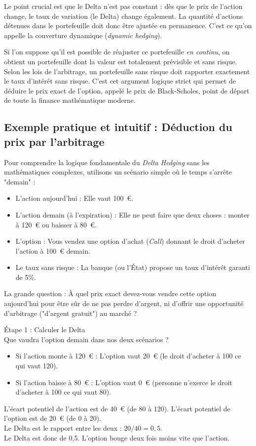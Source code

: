 \begin{remarquebox}
Le point crucial est que le Delta n'est pas constant : dès que le prix de l'action change, le taux de variation (le Delta) change également. La quantité d'actions détenues dans le portefeuille doit donc être ajustée en permanence. C'est ce qu'on appelle la couverture dynamique (\textit{dynamic hedging}).

Si l'on suppose qu'il est possible de réajuster ce portefeuille \textit{en continu}, on obtient un portefeuille dont la valeur est totalement prévisible et sans risque. Selon les lois de l'arbitrage, un portefeuille sans risque doit rapporter exactement le taux d'intérêt sans risque. C'est cet argument logique strict qui permet de déduire le prix exact de l'option, appelé le prix de Black-Scholes, point de départ de toute la finance mathématique moderne.
\end{remarquebox}

\subsection{Exemple pratique et intuitif : Déduction du prix par l'arbitrage}

Pour comprendre la logique fondamentale du \textit{Delta Hedging} sans les mathématiques complexes, utilisons un scénario simple où le temps s'arrête "demain" :
\begin{itemize}[label=$\rightarrow$]
    \item L'action aujourd'hui : Elle vaut 100~€.
    \item L'action demain (à l'expiration) : Elle ne peut faire que deux choses : monter à 120~€ ou baisser à 80~€.
    \item L'option : Vous vendez une option d'achat (\textit{Call}) donnant le droit d'acheter l'action à 100~€ demain.
    \item Le taux sans risque : La banque (ou l'État) propose un taux d'intérêt garanti de 5\%.
\end{itemize}
La grande question : À quel prix exact devez-vous vendre cette option aujourd'hui pour être sûr de ne pas perdre d'argent, ni d'offrir une opportunité d'arbitrage ("d'argent gratuit") au marché ?


Étape 1 : Calculer le Delta\\
Que vaudra l'option demain dans nos deux scénarios ?
\begin{itemize}[label=$\rightarrow$]
    \item Si l'action monte à 120~€ : L'option vaut 20~€ (le droit d'acheter à 100 ce qui vaut 120).
    \item Si l'action baisse à 80~€ : L'option vaut 0~€ (personne n'exerce le droit d'acheter à 100 ce qui vaut 80).
\end{itemize}
L'écart potentiel de l'action est de 40~€ (de 80 à 120). L'écart potentiel de l'option est de 20~€ (de 0 à 20). \\
Le Delta est le rapport entre les deux : $20 / 40 = 0,5$. \\
Le Delta est donc de 0,5. L'option bouge deux fois moins vite que l'action.


